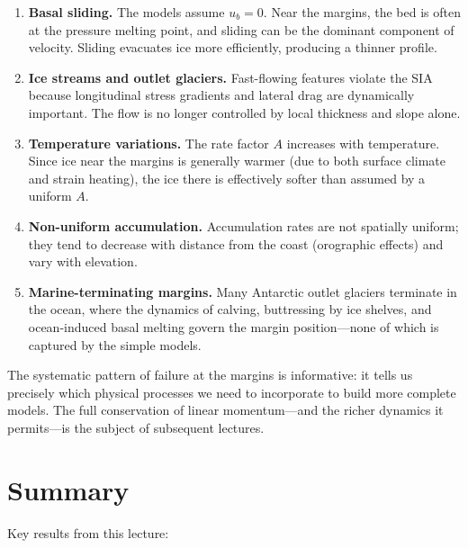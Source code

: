 \documentclass[11pt]{article}
\begin{document}
\begin{enumerate}
  \item \textbf{Basal sliding.}  The models assume $u_b = 0$.  Near the margins, the bed is often at the pressure melting point, and sliding can be the dominant component of velocity.  Sliding evacuates ice more efficiently, producing a thinner profile.

  \item \textbf{Ice streams and outlet glaciers.}  Fast-flowing features violate the SIA because longitudinal stress gradients and lateral drag are dynamically important.  The flow is no longer controlled by local thickness and slope alone.

  \item \textbf{Temperature variations.}  The rate factor $A$ increases with temperature.  Since ice near the margins is generally warmer (due to both surface climate and strain heating), the ice there is effectively softer than assumed by a uniform $A$.

  \item \textbf{Non-uniform accumulation.}  Accumulation rates are not spatially uniform; they tend to decrease with distance from the coast (orographic effects) and vary with elevation.

  \item \textbf{Marine-terminating margins.}  Many Antarctic outlet glaciers terminate in the ocean, where the dynamics of calving, buttressing by ice shelves, and ocean-induced basal melting govern the margin position---none of which is captured by the simple models.
\end{enumerate}

\noindent The systematic pattern of failure at the margins is informative: it tells us precisely which physical processes we need to incorporate to build more complete models.  The full conservation of linear momentum---and the richer dynamics it permits---is the subject of subsequent lectures.

\section{Summary}

Key results from this lecture:
\end{document}
